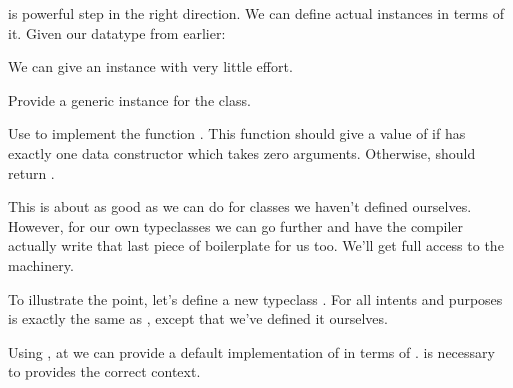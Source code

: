 \documentclass[book.tex]{subfiles}
\begin{document}
 is powerful step in the right direction. We can define actual
 instances in terms of it. Given our  datatype from earlier:


We can give an  instance with very little effort.


\begin{exercise}
Provide a generic instance for the  class.
\end{exercise}
\begin{solution}
\end{solution}

\begin{exercise}
  Use  to implement the function . This function should give a value of  if  has exactly one
  data constructor which takes zero arguments. Otherwise,  should
  return .
\end{exercise}
\begin{solution}
\end{solution}

This is about as good as we can do for classes we haven't defined ourselves.
However, for our own typeclasses we can go further and have the compiler
actually write that last piece of boilerplate for us too. We'll get full access
to the  machinery.

To illustrate the point, let's define a new typeclass . For all intents
and purposes  is exactly the same as , except that we've defined
it ourselves.


Using , at  we can provide a default
implementation of  in terms of .  is
necessary to provides the correct  context.
\end{document}
